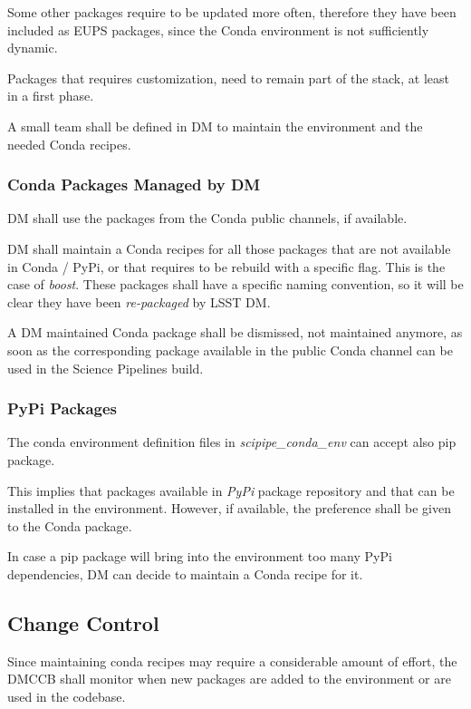 Some other packages require to be updated more often, therefore they have been included as EUPS packages, since the Conda environment is not sufficiently dynamic.

Packages that requires customization, need to remain part of the stack, at least in a first phase.

A small team shall be defined in DM to maintain the environment and the needed Conda recipes.


\subsubsection{Conda Packages Managed by DM} \label{sec:3rddmpkgs}

DM shall use the packages from the Conda public channels, if available.

DM shall maintain a Conda recipes for all those packages that are not available in Conda / PyPi, or that requires to be rebuild with a specific flag. This is the case of \textit{boost}.
These packages shall have a specific naming convention, so it will be clear they have been \textit{re-packaged} by LSST DM.

A DM maintained Conda package shall be dismissed, not maintained anymore, as soon as the corresponding package available in the public Conda channel can be used in the Science Pipelines build.


\subsubsection{PyPi Packages} \label{sec:pypi}

The conda environment definition files in \textit{scipipe\_conda\_env} can accept also pip package. 

This implies that packages available in \textit{PyPi} package repository and that can be installed in the environment. 
However, if available, the preference shall be given to the Conda package.

In case a pip package will bring into the environment too many PyPi dependencies, DM can decide to maintain a Conda recipe for it.


\subsection{Change Control}

Since maintaining conda recipes may require a considerable amount of effort, the DMCCB shall monitor when new packages are added to the environment or are used in the codebase.

